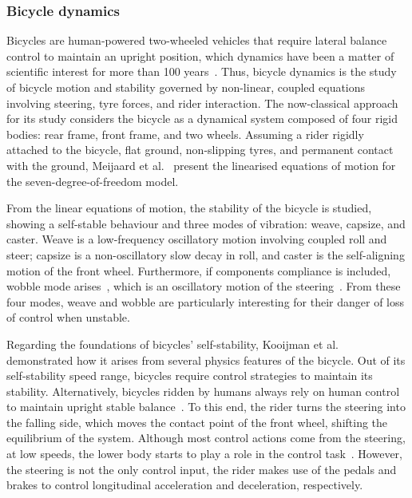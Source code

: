 \documentclass{article}
\begin{document}
\subsubsection{Bicycle dynamics} \label{sec: bike dynamics}
%
Bicycles are human-powered two-wheeled vehicles that require lateral balance control to maintain an upright position, which dynamics have been a matter of scientific interest for more than 100 years~\cite{Car99, Mei07, Whi99}.
%
Thus, bicycle dynamics is the study of bicycle motion and stability governed by non-linear, coupled equations involving steering, tyre forces, and rider interaction.
%
The now-classical approach for its study considers the bicycle as a dynamical system composed of four rigid bodies: rear frame, front frame, and two wheels.
%
Assuming a rider rigidly attached to the bicycle, flat ground, non-slipping tyres, and permanent contact with the ground, Meijaard et al.~\cite{Mei07} present the linearised equations of motion for the seven-degree-of-freedom model.


From the linear equations of motion, the stability of the bicycle is studied, showing a self-stable behaviour and three modes of vibration: weave, capsize, and caster.
%
Weave is a low-frequency oscillatory motion involving coupled roll and steer; capsize is a non-oscillatory slow decay in roll, and caster is the self-aligning motion of the front wheel.
%
Furthermore, if components compliance is included, wobble mode arises~\cite{Sha71, Sch13}, which is an oscillatory motion of the steering~\cite{Lim06}.
%
From these four modes, weave and wobble are particularly interesting for their danger of loss of control when unstable.


Regarding the foundations of bicycles' self-stability, Kooijman et al.~\cite{Koo11} demonstrated how it arises from several physics features of the bicycle.
%
Out of its self-stability speed range, bicycles require control strategies to maintain its stability.
%
Alternatively, bicycles ridden by humans always rely on human control to maintain upright stable balance~\cite{Koo13}.
%
To this end, the rider turns the steering into the falling side, which moves the contact point of the front wheel, shifting the equilibrium of the system.
%
Although most control actions come from the steering, at low speeds, the lower body starts to play a role in the control task~\cite{Koo09}.
%
However, the steering is not the only control input, the rider makes use of the pedals and brakes to control longitudinal acceleration and deceleration, respectively.
\end{document}
